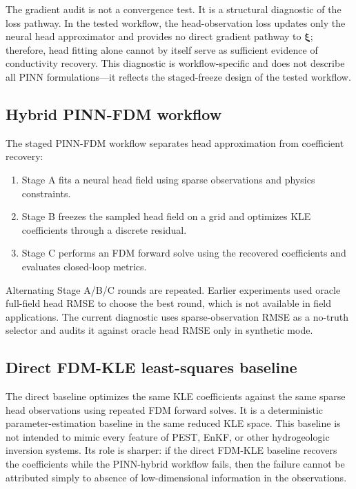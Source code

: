 \documentclass[pdflatex,sn-mathphys,Numbered,iicol]{sn-jnl}
\newcommand{\bxi}{\boldsymbol{\xi}}
\begin{document}
The gradient audit is not a convergence test. It is a structural diagnostic of
the loss pathway. In the tested workflow, the head-observation loss updates only
the neural head approximator and provides no direct gradient pathway to $\bxi$;
therefore, head fitting alone cannot by itself serve as sufficient evidence of conductivity
recovery. This diagnostic is workflow-specific and does not describe all PINN
formulations---it reflects the staged-freeze design of the tested workflow.

\subsection{Hybrid PINN-FDM workflow}
\label{sec:workflow}

The staged PINN-FDM workflow separates head approximation from coefficient
recovery:
\begin{enumerate}
\item Stage A fits a neural head field using sparse observations and physics
  constraints.
\item Stage B freezes the sampled head field on a grid and optimizes KLE
  coefficients through a discrete residual.
\item Stage C performs an FDM forward solve using the recovered coefficients
  and evaluates closed-loop metrics.
\end{enumerate}
Alternating Stage A/B/C rounds are repeated. Earlier experiments used oracle
full-field head RMSE to choose the best round, which is not available in field
applications. The current diagnostic uses sparse-observation RMSE as a
no-truth selector and audits it against oracle head RMSE only in synthetic
mode.

\subsection{Direct FDM-KLE least-squares baseline}
\label{sec:baseline}

The direct baseline optimizes the same KLE coefficients against the same
sparse head observations using repeated FDM forward solves. It is a
deterministic parameter-estimation baseline in the same reduced KLE space.
This baseline is not intended to mimic every feature of PEST, EnKF, or other
hydrogeologic inversion systems. Its role is sharper: if the direct FDM-KLE
baseline recovers the coefficients while the PINN-hybrid workflow fails, then
the failure cannot be attributed simply to absence of low-dimensional
information in the observations.
\end{document}
